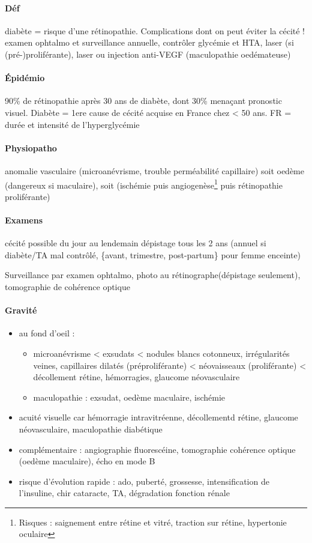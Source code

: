 \documentclass[11pt]{article}
\begin{document}
\paragraph{Déf}
\label{sec:orgcf1e7d9}
diabète = risque d'une rétinopathie. Complications dont on peut éviter la
cécité ! \thus examen ophtalmo et surveillance annuelle, contrôler glycémie et
HTA, laser (si (pré-)proliférante), laser ou injection anti-VEGF (maculopathie
oedémateuse)

\paragraph{Épidémio}
\label{sec:orgc0f9e8c}
90\% de rétinopathie après 30 ans de diabète, dont 30\% menaçant pronostic
visuel. Diabète = 1ere cause de cécité acquise en France chez < 50 ans. FR =
durée et intensité de l'hyperglycémie

\paragraph{Physiopatho}
\label{sec:org6aa50a2}
anomalie vasculaire (microanévrisme, trouble perméabilité capillaire) \thus soit
oedème (dangereux si maculaire), soit (ischémie puis angiogenèse\footnote{Risques : saignement entre rétine et vitré, traction sur rétine,
hypertonie oculaire} puis rétinopathie proliférante)

\paragraph{Examens}
\label{sec:orgfc71cbd}
cécité possible du jour au lendemain \skull \thus dépistage tous les 2 ans
(annuel si diabète/TA mal contrôlé, \{avant, trimestre, post-partum\} pour femme
enceinte)

Surveillance par examen ophtalmo, photo au rétinographe(dépistage seulement), tomographie de
cohérence optique

\paragraph{Gravité}
\label{sec:orga004c31}
\begin{itemize}
\item au fond d'oeil : 
\begin{itemize}
\item microanévrisme < exsudats < nodules blancs cotonneux, irrégularités \diameter{} veines, capillaires dilatés (préproliférante) < néovaisseaux (proliférante) < décollement rétine, hémorragies, glaucome néovasculaire
\item maculopathie : exsudat, oedème maculaire, ischémie
\end{itemize}
\item \dec acuité visuelle car hémorragie intravitréenne, décollementd rétine,
glaucome néovasculaire, maculopathie diabétique
\item complémentaire : angiographie fluorescéine, tomographie cohérence optique
(oedème maculaire), écho en mode B
\item risque d'évolution rapide : ado, puberté, grossesse, intensification de
l'insuline, chir cataracte, \inc TA, dégradation fonction rénale
\end{itemize}
\end{document}
